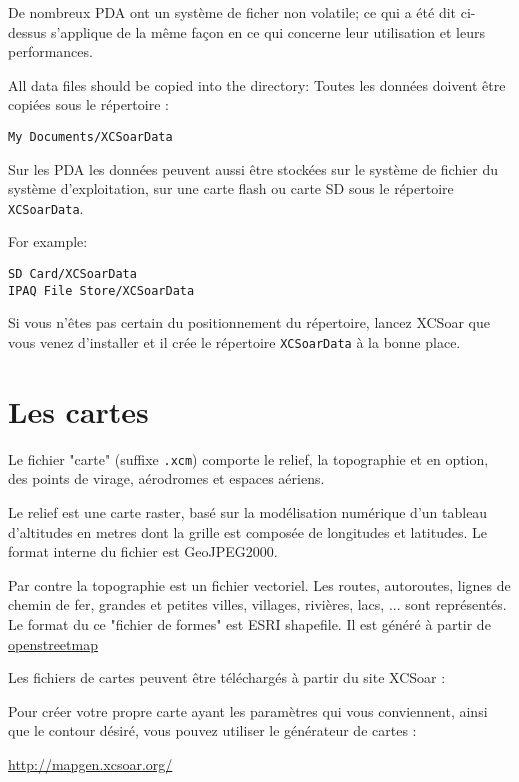 De nombreux PDA ont un système de ficher non volatile; ce qui a été dit ci-dessus s'applique de la même façon en ce qui concerne leur utilisation et leurs performances.

All data files should be copied into the directory: 
Toutes les données doivent être copiées sous le répertoire :
\begin{verbatim}
My Documents/XCSoarData
\end{verbatim}

Sur les PDA les données peuvent aussi être stockées sur le système de fichier du système d'exploitation, sur une carte flash ou carte SD sous le répertoire
\verb|XCSoarData|.

For example:
\begin{verbatim}
SD Card/XCSoarData
IPAQ File Store/XCSoarData
\end{verbatim}

Si vous n'êtes pas certain du positionnement du répertoire, lancez XCSoar que vous venez d'installer et il crée le répertoire \verb|XCSoarData| à la bonne place.

\section{Les cartes}\label{sec:map}

Le fichier "carte" (suffixe \verb|.xcm|) comporte le relief, la topographie et en option, des points de virage, aérodromes et espaces aériens.

Le relief est une carte raster, basé sur la modélisation numérique d'un tableau d'altitudes en metres dont la grille est composée de longitudes et latitudes. Le format interne du fichier est GeoJPEG2000.

Par contre la topographie est un fichier vectoriel. Les routes, autoroutes, lignes de chemin de fer, grandes et petites villes, villages, rivières, lacs, ... sont représentés. Le format du ce "fichier de formes" est ESRI shapefile. Il est généré à partir de  {\href{http://www.openstreetmap.org/}{openstreetmap}}

Les fichiers de cartes peuvent être téléchargés à partir du site XCSoar :


Pour créer votre propre carte ayant les paramètres qui vous conviennent, ainsi que le contour désiré, vous pouvez utiliser le générateur de cartes :

\url{http://mapgen.xcsoar.org/}

